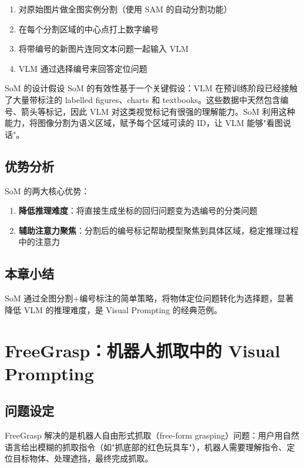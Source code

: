 \documentclass[a4paper]{article}
\begin{document}
\begin{enumerate}
    \item 对原始图片做全图实例分割（使用 SAM 的自动分割功能）
    \item 在每个分割区域的中心点打上数字编号
    \item 将带编号的新图片连同文本问题一起输入 VLM
    \item VLM 通过选择编号来回答定位问题
\end{enumerate}

\begin{importantbox}{SoM 的设计假设}
SoM 的有效性基于一个关键假设：VLM 在预训练阶段已经接触了大量带标注的 labelled figures、charts 和 textbooks。这些数据中天然包含编号、箭头等标记，因此 VLM 对这类视觉标记有很强的理解能力。SoM 利用这种能力，将图像分割为语义区域，赋予每个区域可读的 ID，让 VLM 能够"看图说话"。
\end{importantbox}

\subsection{优势分析}

SoM 的两大核心优势：

\begin{enumerate}
    \item \textbf{降低推理难度}：将直接生成坐标的回归问题变为选编号的分类问题
    \item \textbf{辅助注意力聚焦}：分割后的编号标记帮助模型聚焦到具体区域，稳定推理过程中的注意力
\end{enumerate}

\subsection{本章小结}

SoM 通过全图分割+编号标注的简单策略，将物体定位问题转化为选择题，显著降低 VLM 的推理难度，是 Visual Prompting 的经典范例。


\section{FreeGrasp：机器人抓取中的 Visual Prompting}

\subsection{问题设定}

FreeGrasp 解决的是机器人自由形式抓取（free-form grasping）问题：用户用自然语言给出模糊的抓取指令（如"抓底部的红色玩具车"），机器人需要理解指令、定位目标物体、处理遮挡，最终完成抓取。
\end{document}
